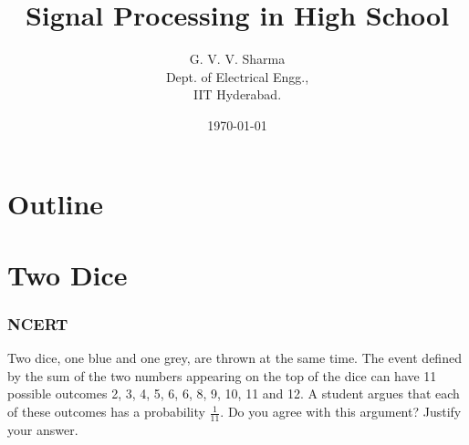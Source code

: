 \documentclass{beamer}
\title{Signal Processing in High School}
\author{G. V. V. Sharma \\ Dept. of Electrical Engg.,\\IIT Hyderabad.}
\date{\today}
\theoremstyle{remark}
\numberwithin{equation}{section}
\begin{document}
\begin{frame}
\titlepage
\end{frame}

\section*{Outline}
\begin{frame}
\tableofcontents
\end{frame}
\section{Two Dice}
\begin{frame}
\frametitle{NCERT}
Two dice, one blue and one grey, are thrown at the same time.   The event defined by the sum of the two numbers appearing on the top of the dice can have 11 possible outcomes 2, 3, 4, 5, 6, 6, 8, 9, 10, 11 and 12.  A student argues that each of these outcomes has a probability $\frac{1}{11}$.  Do you agree with this argument?  Justify your answer.
\end{frame}
\end{document}
